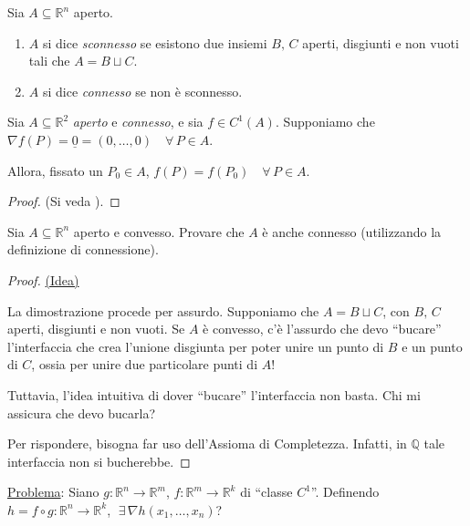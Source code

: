 \begin{definition}
Sia $A \subseteq \mathbb{R}^n$ aperto.
\begin{enumerate}[labelindent=\parindent,leftmargin=*,label=\textnormal{(\roman*)},start=1]
\item $A$ si dice \emph{sconnesso} se esistono due insiemi $B,\,C$ aperti, disgiunti e non vuoti tali che $A = B \sqcup C$.
\item $A$ si dice \emph{connesso} se non è sconnesso.
\end{enumerate}
\end{definition}

\begin{cor}
Sia $A \subseteq \mathbb{R}^2$ \emph{aperto} e \emph{connesso}, e sia $f \in C^1(A)$. Supponiamo che $\nabla f(P) = \underline{0} = (0,\ldots,0) \quad \forall \, P \in A$.

Allora, fissato un $P_0 \in A$, $f(P)=f(P_0) \quad \forall \, P \in A$.
\end{cor}
\begin{proof}
(Si veda \cite{Giusti2003}).
\end{proof}

\begin{exer}
Sia $A \subseteq \mathbb{R}^n$ aperto e convesso. Provare che $A$ è anche connesso (utilizzando la definizione di connessione).
\end{exer}
\begin{proof}
\underline{(Idea)}

La dimostrazione procede per assurdo. Supponiamo che $A = B \sqcup C$, con $B,\,C$ aperti, disgiunti e non vuoti. Se $A$ è convesso, c'è l'assurdo che devo ``bucare'' l'interfaccia che crea l'unione disgiunta per poter unire un punto di $B$ e un punto di $C$, ossia per unire due particolare punti di $A$!

\begin{center}
\def\svgwidth{8cm}

\end{center}

Tuttavia, l'idea intuitiva di dover ``bucare'' l'interfaccia non basta. Chi mi assicura che devo bucarla?

Per rispondere, bisogna far uso dell'Assioma di Completezza. Infatti, in $\mathbb{Q}$ tale interfaccia non si bucherebbe.
\end{proof}


\underline{Problema}: Siano $g: \mathbb{R}^n \longrightarrow \mathbb{R}^m$, $f: \mathbb{R}^m \longrightarrow \mathbb{R}^k$ di ``classe $C^1$''. Definendo $h = f \circ g : \mathbb{R}^n \longrightarrow \mathbb{R}^k$, $\; \exists\,  \nabla h(x_1,\ldots,x_n)$?


